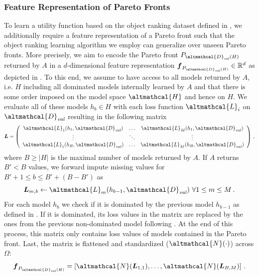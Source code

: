 \subsubsection*{Feature Representation of Pareto Fronts}
To learn a utility function based on the object ranking dataset defined in , we additionally require a feature representation of a Pareto front such that the object ranking learning algorithm we employ can generalize over unseen Pareto fronts.
More precisely, we aim to encode the Pareto front $P_{\altmathcal{D}_\mathit{val}(H)}$ returned by $A$ in a $d$-dimensional feature representation $\vec{f}_{P_{\altmathcal{D}_\mathit{val}(H)}} \in \mathbb{R}^d$ as depicted in . To this end, we assume to have access to all models returned by $A$, i.e. $H$ including all dominated models internally learned by $A$ and that there is some order imposed on the model space $\altmathcal{H}$ and hence on $H$. We evaluate all of these models $h_b \in H$ with each loss function $\altmathcal{L}_i$ on $\altmathcal{D}_\mathit{val}$ resulting in the following matrix
\begin{equation}
    \vec{L} = \left( \begin{array}{ccc}
         \altmathcal{L}_1(h_1,\altmathcal{D}_{\mathit{val}}) & \ldots & \altmathcal{L}_M(h_1,\altmathcal{D}_{\mathit{val}}) \\
         \vdots & \ddots & \vdots \\
         \altmathcal{L}_1(h_B,\altmathcal{D}_{\mathit{val}}) & \ldots & \altmathcal{L}_M(h_B,\altmathcal{D}_{\mathit{val}}) \\
    \end{array} \right) \, ,
\end{equation} 
where $B \geq \vert H \vert$ is the maximal number of models returned by $A$. If $A$ returns $B' < B$ values, we forward impute missing values for $B' + 1 \leq b \leq B' + (B - B')$ as 
\begin{equation}\label{moo-eq:replace_dominated}
    \vec{L}_{m,b} \leftarrow \altmathcal{L}_m(h_{b-1},\altmathcal{D}_{\mathit{val}}) ~ \forall 1 \leq m \leq M \, . 
\end{equation} 
For each model $h_b$ we check if it is dominated by the previous model $h_{b-1}$ as defined in . If it is dominated, its loss values in the matrix are replaced by the ones from the previous non-dominated model following .
At the end of this process, this matrix only contains loss values of 
models contained in the Pareto front.
Last, the matrix is flattened and standardized ($\altmathcal{N}(\cdot)$) across $\Omega$: 
\begin{equation}\label{moo-eq:feature_representation}
    \vec{f}_{P_{\altmathcal{D}_\mathit{val}(H)}} = \left[ \altmathcal{N}(\vec{L}_{1,1}), 
    \ldots, \altmathcal{N}(\vec{L}_{B,M}) \right] \, .
\end{equation}

